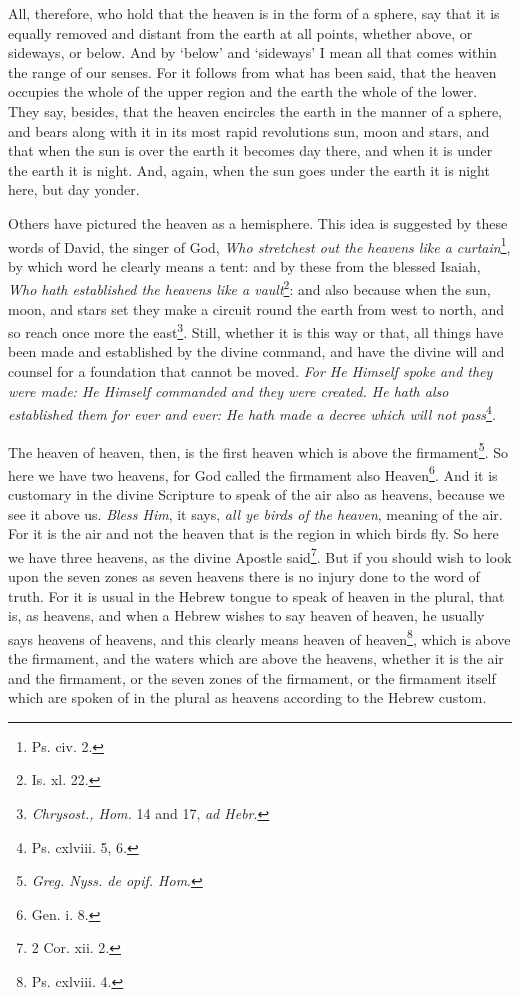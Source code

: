 All, therefore, who hold that the heaven is in the form of a sphere, say that it is equally removed and distant from the earth at all points, whether above, or sideways, or below. And by ‘below’ and ‘sideways’ I mean all that comes within the range of our senses. For it follows from what has been said, that the heaven occupies the whole of the upper region and the earth the whole of the lower. They say, besides, that the heaven encircles the earth in the manner of a sphere, and bears along with it in its most rapid revolutions sun, moon and stars, and that when the sun is over the earth it becomes day there, and when it is under the earth it is night. And, again, when the sun goes under the earth it is night here, but day yonder.

Others have pictured the heaven as a hemisphere. This idea is suggested by these words of David, the singer of God, \emph{Who stretchest out the heavens like a curtain}\footnote{Ps. civ. 2.}, by which word he clearly means a tent: and by these from the blessed Isaiah, \emph{Who hath established the heavens like a vault}\footnote{Is. xl. 22.}: and also because when the sun, moon, and stars set they make a circuit round the earth from west to north, and so reach once more the east\footnote{\emph{Chrysost., Hom. }14 and 17, \emph{ad Hebr}.}. Still, whether it is this way or that, all things have been made and established by the divine command, and have the divine will and counsel for a foundation that cannot be moved. \emph{For He Himself spoke and they were made: He Himself commanded and they were created. He hath also established them for ever and ever: He hath made a decree which will not pass}\footnote{Ps. cxlviii. 5, 6.}.

The heaven of heaven, then, is the first heaven which is above the firmament\footnote{\emph{Greg. Nyss. de opif. Hom}.}. So here we have two heavens, for God called the firmament also Heaven\footnote{Gen. i. 8.}. And it is customary in the divine Scripture to speak of the air also as heavens, because we see it above us. \emph{Bless Him}, it says, \emph{all ye birds of the heaven}, meaning of the air. For it is the air and not the heaven that is the region in which birds fly. So here we have three heavens, as the divine Apostle said\footnote{2 Cor. xii. 2.}. But if you should wish to look upon the seven zones as seven heavens there is no injury done to the word of truth. For it is usual in the Hebrew tongue to speak of heaven in the plural, that is, as heavens, and when a Hebrew wishes to say heaven of heaven, he usually says heavens of heavens, and this clearly means heaven of heaven\footnote{Ps. cxlviii. 4.}, which is above the firmament, and the waters which are above the heavens, whether it is the air and the firmament, or the seven zones of the firmament, or the firmament itself which are spoken of in the plural as heavens according to the Hebrew custom.

